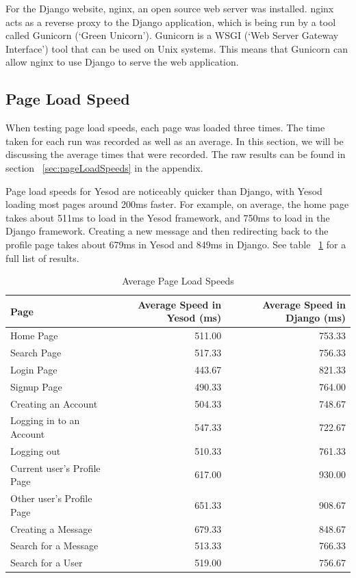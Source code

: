 For the Django website, nginx, an open source web server was installed. nginx
acts as a reverse proxy to the Django application, which is being run by a tool
called Gunicorn (`Green Unicorn'). Gunicorn is a WSGI (`Web Server Gateway
Interface') tool that can be used on Unix systems. \parencite{djangoGunicorn} This means that Gunicorn
can allow nginx to use Django to serve the web application.

\subsection{Page Load Speed}
\label{sec:pageLoadSpeed}

When testing page load speeds, each page was loaded three times. The time
taken for each run was recorded as well as an average. In this section,
we will be discussing the average times that were recorded. The raw
results can be found in section ~\ref{sec:pageLoadSpeeds} in the appendix.

Page load speeds for Yesod are noticeably quicker than Django, with Yesod
loading most pages around 200ms faster. For example, on average, the home page
takes about 511ms to load in the Yesod framework, and 750ms to load in the
Django framework. Creating a new message and then redirecting back to the
profile page takes about 679ms in Yesod and 849ms in Django. See
table ~\ref{tab:pageLoadAverageSpeeds} for a full list of results.

\begin{table}[H]
	\caption{Average Page Load Speeds}
	\begin{center}
		\begin{tabular}{ | l | r | r |}
			\hline
			Page & Average Speed in Yesod (ms) & Average Speed in Django (ms) \\
			\hline
			Home Page & 511.00 & 753.33 \\
			Search Page & 517.33 & 756.33 \\
			Login Page & 443.67 & 821.33 \\
			Signup Page & 490.33 & 764.00 \\
			Creating an Account & 504.33 & 748.67 \\
			Logging in to an Account & 547.33 & 722.67 \\
			Logging out & 510.33 & 761.33 \\
			Current user's Profile Page & 617.00 & 930.00 \\
			Other user's Profile Page & 651.33 & 908.67 \\
			Creating a Message & 679.33 & 848.67 \\
			Search for a Message & 513.33 & 766.33 \\
			Search for a User & 519.00 & 756.67 \\
			\hline
		\end{tabular}
	\end{center}
	\label{tab:pageLoadAverageSpeeds}
\end{table}

